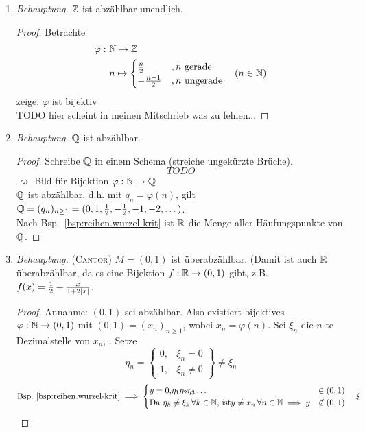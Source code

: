 \documentclass[12pt]{scrreprt}
\begin{document}
\begin{bsp}
  \label{bsp:reihen.abzaehlbar}
  \begin{enumerate}
  \item \label{bsp:reihen.abzaehlbar.a}
    \emph{Behauptung.} $\mathbb{Z}$ ist abzählbar unendlich.
    \begin{proof}
      Betrachte
      \begin{align*}
        \varphi: \ &\mathbb{N}\rightarrow\mathbb{Z}\\
        &n \mapsto
        \begin{cases}
          \frac{n}{2}    &, n \text{ gerade} \\
          -\frac{n-1}{2} &, n \text{ ungerade}
        \end{cases}
        \quad(n\in\mathbb{N})
      \end{align*}
      zeige: $\varphi$ ist bijektiv\\
      TODO hier scheint in meinen Mitschrieb was zu fehlen...
    \end{proof}
  \item \label{bsp:reihen.abzaehlbar.b}
    \emph{Behauptung.} $\mathbb{Q}$ ist abzählbar.
    \begin{proof}
      Schreibe $\mathbb{Q}$ in einem Schema (streiche ungekürzte Brüche).
      \[TODO\]
      $\rightsquigarrow$ Bild für Bijektion $\varphi:
      \mathbb{N}\rightarrow\mathbb{Q}$ \\ \folgt $\mathbb{Q}$ ist abzählbar,
      d.h. mit $q_n=\varphi(n)$,  gilt $\mathbb{Q} = (q_n)_{n\ge1}
      = (0, 1, \frac12, -\frac12, -1, -2, \dotsc)$.\\
      Nach Bsp.~\ref{bsp:reihen.wurzel-krit} ist $\mathbb{R}$ die Menge
      aller Häufungspunkte von $\mathbb{Q}$.
    \end{proof}
  \item \label{bsp:reihen.abzaehlbar.c}
    \emph{Behauptung.} (\textsc{Cantor}) $M=(0,1)$ ist
    überabzählbar. (Damit ist auch $\mathbb{R}$ überabzählbar, da es eine
    Bijektion $f: \mathbb{R} \rightarrow (0,1)$ gibt,
    z.B. $f(x)=\frac12+\frac{x}{1+2\left\lvert x\right\lvert}$.
    \begin{proof}
      Annahme: $(0,1)$ sei abzählbar. Also existiert bijektives
      $\varphi: \mathbb{N}\rightarrow(0,1)$ mit $(0,1) = (x_n)_{n\ge1}$, wobei
      $x_n=\varphi(n)$. Sei $\xi_n$ die $n$-te Dezimalstelle von
      $x_n$, . Setze \[\eta_n=
      \begin{Bmatrix}
        0, & \xi_n=0 \\
        1, & \xi_n\ne0
      \end{Bmatrix}
      \ne \xi_n\]
      \[\text{Bsp.~\ref{bsp:reihen.wurzel-krit}} \implies
      \begin{cases}
        y=0{,}\eta_1\eta_2\eta_3\dotsc &\in (0,1) \\
        \text{Da } \eta_k\ne\xi_k\,\forall k\in\mathbb{N} \text{, ist} y\ne
        x_n\,\forall n\in\mathbb{N} \implies y &\not\in (0,1)
      \end{cases}
      \quad \lightning \]
    \end{proof}
  \end{enumerate}
\end{bsp}
\end{document}

